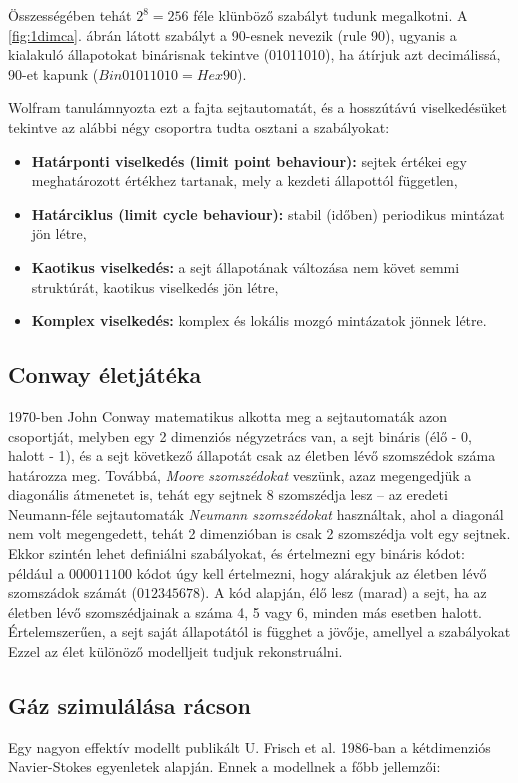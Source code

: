 \documentclass[12pt]{article}
\theoremstyle{plain}
\begin{document}
Összességében tehát $2^8 = 256$ féle klünböző szabályt tudunk megalkotni. A \ref{fig:1dimca}. ábrán látott szabályt a 90-esnek nevezik (rule 90), ugyanis a kialakuló állapotokat binárisnak tekintve (01011010), ha átírjuk azt decimálissá, 90-et kapunk ($Bin 01011010 = Hex 90$). 

Wolfram tanulámnyozta ezt a fajta sejtautomatát, és a hosszútávú viselkedésüket tekintve az alábbi négy csoportra tudta osztani a szabályokat:

\begin{itemize}
\item \textbf{Határponti viselkedés (limit point behaviour):} sejtek értékei egy meghatározott értékhez tartanak, mely a kezdeti állapottól független,
\item \textbf{Határciklus (limit cycle behaviour):} stabil (időben) periodikus mintázat jön létre,
\item \textbf{Kaotikus viselkedés:} a sejt állapotának változása nem követ semmi struktúrát, kaotikus viselkedés jön létre,
\item \textbf{Komplex viselkedés:} komplex és lokális mozgó mintázatok jönnek létre.
\end{itemize}

\subsection{Conway életjátéka}

1970-ben John Conway matematikus alkotta meg a sejtautomaták azon csoportját, melyben egy 2 dimenziós négyzetrács van, a sejt bináris (élő - 0, halott - 1), és a sejt következő állapotát csak az életben lévő szomszédok száma határozza meg. Továbbá, \textit{Moore szomszédokat} veszünk, azaz megengedjük a diagonális átmenetet is, tehát egy sejtnek 8 szomszédja lesz -- az eredeti Neumann-féle sejtautomaták \textit{Neumann szomszédokat} használtak, ahol a diagonál nem volt megengedett, tehát 2 dimenzióban is csak 2 szomszédja volt egy sejtnek.\\
Ekkor szintén lehet definiálni szabályokat, és értelmezni egy bináris kódot: például a $000011100$ kódot úgy kell értelmezni, hogy alárakjuk az életben lévő szomszádok számát ($012345678$). A kód alapján, élő lesz (marad) a sejt, ha az életben lévő szomszédjainak a száma 4, 5 vagy 6, minden más esetben halott. Értelemszerűen, a sejt saját állapotától is függhet a jövője, amellyel a szabályokat Ezzel az élet különöző modelljeit tudjuk rekonstruálni.  

\subsection{Gáz szimulálása rácson}
Egy nagyon effektív modellt publikált U. Frisch et al. 1986-ban a kétdimenziós Navier-Stokes egyenletek alapján. Ennek a modellnek a főbb jellemzői:
\end{document}
